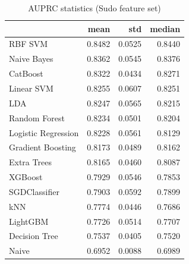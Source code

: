 \begin{table}
\caption{AUPRC statistics (Sudo feature set)}
\label{tab:auprc_Sudo_stats}
\begin{tabular}{lrrr}
\toprule
 & mean & std & median \\
\midrule
RBF SVM & 0.8482 & 0.0525 & 0.8440 \\
Naive Bayes & 0.8362 & 0.0545 & 0.8376 \\
CatBoost & 0.8322 & 0.0434 & 0.8271 \\
Linear SVM & 0.8255 & 0.0607 & 0.8251 \\
LDA & 0.8247 & 0.0565 & 0.8215 \\
Random Forest & 0.8234 & 0.0501 & 0.8204 \\
Logistic Regression & 0.8228 & 0.0561 & 0.8129 \\
Gradient Boosting & 0.8173 & 0.0489 & 0.8162 \\
Extra Trees & 0.8165 & 0.0460 & 0.8087 \\
XGBoost & 0.7929 & 0.0546 & 0.7853 \\
SGDClassifier & 0.7903 & 0.0592 & 0.7899 \\
kNN & 0.7774 & 0.0446 & 0.7686 \\
LightGBM & 0.7726 & 0.0514 & 0.7707 \\
Decision Tree & 0.7537 & 0.0405 & 0.7520 \\
Naive & 0.6952 & 0.0088 & 0.6989 \\
\bottomrule
\end{tabular}
\end{table}
